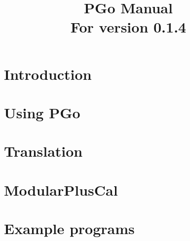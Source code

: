 \documentclass[notitlepage]{article}
\title{PGo Manual\\
	\normalsize{For version 0.1.4}}
\begin{document}
\maketitle

\section{Introduction}


\section{Using PGo}


\section{Translation}


\section{ModularPlusCal} \label{modularpcal}


\section{Example programs}

\end{document}
